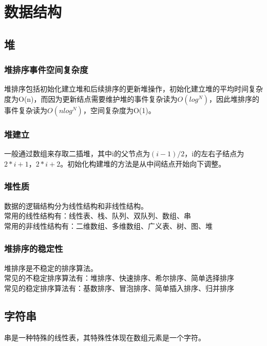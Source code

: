 \chapter{数据结构}
\section{堆}
\subsection{堆排序事件空间复杂度}
堆排序包括初始化建立堆和后续排序的更新堆操作，初始化建立堆的平均时间复杂度为O(n)，而因为更新结点需要维护堆的事件复杂读为$O(log^N)$，因此堆排序的事件复杂读为$O(nlog^N)$，空间复杂度为O(1)。
\subsection{堆建立}
一般通过数组来存取二插堆，其中i的父节点为$(i-1)/2$，i的左右子结点为$2*i+1$，$2*i+2$。初始化构建堆的方法是从中间结点开始向下调整。
\subsection{堆性质}
数据的逻辑结构分为线性结构和非线性结构。\\
常用的线性结构有：线性表、栈、队列、双队列、数组、串\\
常用的非线性结构有：二维数组、多维数组、广义表、树、图、堆
\subsection{堆排序的稳定性}
堆排序是不稳定的排序算法。\\
常见的不稳定排序算法有：堆排序、快速排序、希尔排序、简单选择排序\\
常见的稳定排序算法有：基数排序、冒泡排序、简单插入排序、归并排序
\section{字符串}
串是一种特殊的线性表，其特殊性体现在数组元素是一个字符。
